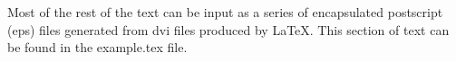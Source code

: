 

\setlength{\topmargin}{0cm}
\setlength{\topskip}{0cm}
\setlength{\textheight}{88cm}
\setlength{\footskip}{0cm}
\pagestyle{empty}


\setlength{\textwidth}{25cm}




\Large

Most of the rest of the text can be input as a series of encapsulated
postscript (eps) files generated from dvi files produced by \LaTeX.
This section of text can be found in the example.tex file.



